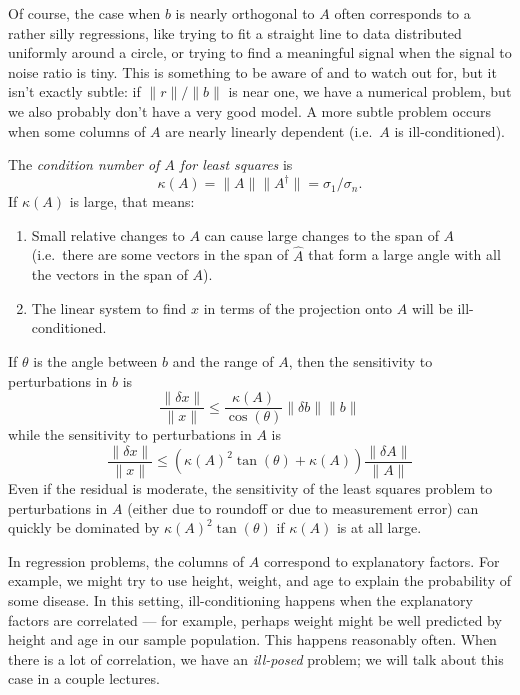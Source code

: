 \documentclass[12pt, leqno]{article}
\begin{document}
Of course, the case when $b$ is nearly orthogonal to $A$ often
corresponds to a rather silly regressions, like trying to fit a
straight line to data distributed uniformly around a circle, or trying
to find a meaningful signal when the signal to noise ratio is tiny.
This is something to be aware of and to watch out for, but it isn't
exactly subtle: if $\|r\|/\|b\|$ is near one, we have a numerical
problem, but we also probably don't have a very good model.  A more
subtle problem occurs when some columns of $A$ are nearly linearly
dependent (i.e.~$A$ is ill-conditioned).

The {\em condition number of $A$ for least squares} is
\[
  \kappa(A) = \|A\| \|A^\dagger\| = \sigma_1/\sigma_n.
\]
If $\kappa(A)$ is large, that means:
\begin{enumerate}
\item Small relative changes to $A$ can cause large changes to the
  span of $A$ (i.e.~there are some vectors in the span of $\hat A$
  that form a large angle with all the vectors in the span of $A$).
\item The linear system to find $x$ in terms of the projection onto
  $A$ will be ill-conditioned.
\end{enumerate}
If $\theta$ is the angle between $b$ and the range of $A$, then the
sensitivity to perturbations in $b$ is
\[
\frac{\|\delta x\|}{\|x\|} \leq
\frac{\kappa(A)}{\cos(\theta)}{\|\delta b\|}{\|b\|}
\]
while the sensitivity to perturbations in $A$ is
\[
\frac{\|\delta x\|}{\|x\|} \leq
\left( \kappa(A)^2 \tan(\theta) + \kappa(A) \right) \frac{\|\delta A\|}{\|A\|}
\]
Even if the residual is moderate, the sensitivity of the least squares
problem to perturbations in $A$ (either due to roundoff or due to
measurement error) can quickly be dominated by $\kappa(A)^2
\tan(\theta)$ if $\kappa(A)$ is at all large.

In regression problems, the columns of $A$ correspond to explanatory
factors.  For example, we might try to use height, weight, and age to
explain the probability of some disease.  In this setting,
ill-conditioning happens when the explanatory factors are correlated
--- for example, perhaps weight might be well predicted by height and
age in our sample population.  This happens reasonably often.  When
there is a lot of correlation, we have an {\em ill-posed} problem;
we will talk about this case in a couple lectures.
\end{document}
